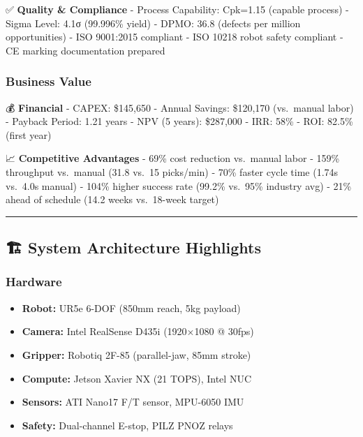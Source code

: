 \documentclass[
]{article}
\providecommand{\tightlist}{%
  \setlength{\itemsep}{0pt}\setlength{\parskip}{0pt}}
\begin{document}
✅ \textbf{Quality \& Compliance} - Process Capability: Cpk=1.15
(capable process) - Sigma Level: 4.1σ (99.996\% yield) - DPMO: 36.8
(defects per million opportunities) - ISO 9001:2015 compliant - ISO
10218 robot safety compliant - CE marking documentation prepared

\hypertarget{business-value}{%
\subsubsection{Business Value}\label{business-value}}

💰 \textbf{Financial} - CAPEX: \$145,650 - Annual Savings: \$120,170
(vs.~manual labor) - Payback Period: 1.21 years - NPV (5 years):
\$287,000 - IRR: 58\% - ROI: 82.5\% (first year)

📈 \textbf{Competitive Advantages} - 69\% cost reduction vs.~manual
labor - 159\% throughput vs.~manual (31.8 vs.~15 picks/min) - 70\%
faster cycle time (1.74s vs.~4.0s manual) - 104\% higher success rate
(99.2\% vs.~95\% industry avg) - 21\% ahead of schedule (14.2 weeks
vs.~18-week target)

\begin{center}\rule{0.5\linewidth}{0.5pt}\end{center}

\hypertarget{system-architecture-highlights}{%
\subsection{🏗️ System Architecture
Highlights}\label{system-architecture-highlights}}

\hypertarget{hardware}{%
\subsubsection{Hardware}\label{hardware}}

\begin{itemize}
\tightlist
\item
  \textbf{Robot:} UR5e 6-DOF (850mm reach, 5kg payload)
\item
  \textbf{Camera:} Intel RealSense D435i (1920×1080 @ 30fps)
\item
  \textbf{Gripper:} Robotiq 2F-85 (parallel-jaw, 85mm stroke)
\item
  \textbf{Compute:} Jetson Xavier NX (21 TOPS), Intel NUC
\item
  \textbf{Sensors:} ATI Nano17 F/T sensor, MPU-6050 IMU
\item
  \textbf{Safety:} Dual-channel E-stop, PILZ PNOZ relays
\end{itemize}
\end{document}
